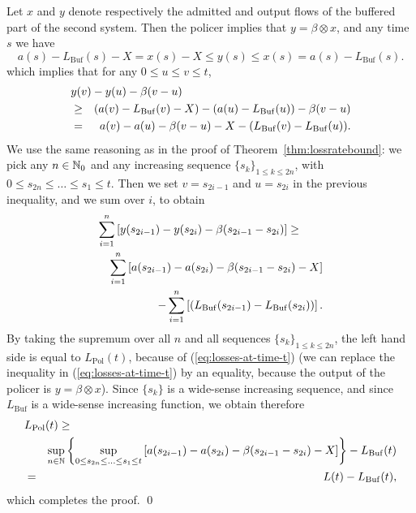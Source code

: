 \pr
Let $x$ and $y$ denote respectively the admitted and output flows of the
 buffered part of the second system. Then the policer implies that $y = \beta \otimes x$,
and any time $s$ we have
\[ a(s) - L_{\mathrm{Buf}}(s) - X = x(s) - X \leq y(s) \leq x(s) =
a(s) - L_{\mathrm{Buf}}(s). \]
which implies that for any $0 \leq u \leq v \leq t$,
\begin{eqnarray*}
\lefteqn{y(v) - y(u) - \beta(v-u)} \\
 & \geq &  (a(v) - L_{\mathrm{Buf}}(v) -X)  - (a(u) - L_{\mathrm{Buf}}(u))  - \beta(v-u) \\
 & = & a(v) - a(u)  - \beta(v-u) - X - (L_{\mathrm{Buf}}(v) - L_{\mathrm{Buf}}(u)).
\end{eqnarray*}
We use the same reasoning as in the proof of Theorem~\ref{thm:lossratebound}: we
pick any $n \in \mathbb{N}_0$ and any increasing sequence $\{ s_k \}_{1 \leq k \leq 2n}$, with $0 \leq s_{2n} \leq \ldots \leq s_1 \leq t$. Then we set $v = s_{2i-1}$ and $u = s_{2i}$ in the previous
inequality, and we sum over $i$, to obtain
\begin{eqnarray*}
\lefteqn{ \sum_{i=1}^{n} \left[ y(s_{2i-1})-y(s_{2i})-
\beta(s_{2i-1}-s_{2i}) \right] \geq } \\
 && \sum_{i=1}^{n} \left[
a(s_{2i-1})-a(s_{2i})- \beta(s_{2i-1}-s_{2i}) - X \right] \\ && -
\sum_{i=1}^{n} \left[ (L_{\mathrm{Buf}}(s_{2i-1}) -
L_{\mathrm{Buf}}(s_{2i})) \right].
\end{eqnarray*}
By taking the supremum over all $n$ and all sequences $\{ s_k
\}_{1 \leq k \leq 2n}$, the left hand side is equal to
$L_{\mathrm{Pol}}(t)$,  because of (\ref{eq:losses-at-time-t}) (we
can replace the inequality in (\ref{eq:losses-at-time-t}) by an
equality, because the output of the policer is $y = \beta \otimes
x$). Since $\{ s_k \}$ is a wide-sense increasing sequence, and
since $L_{\mathrm{Buf}}$ is a wide-sense increasing function, we
obtain therefore
\begin{eqnarray*}
\lefteqn{L_{\mathrm{Pol}}(t)  \geq}\\
 & & \sup_{n \in \Nats}  \left\{ \sup_{0 \leq
s_{2n} \leq \ldots \leq s_1 \leq t} \left[ a(s_{2i-1})-a(s_{2i})- \beta(s_{2i-1}-s_{2i}) - X \right] \right\} -  L_{\mathrm{Buf}}(t) \\
& = & L(t) - L_{\mathrm{Buf}}(t),
\end{eqnarray*}
which completes the proof.
\qed

